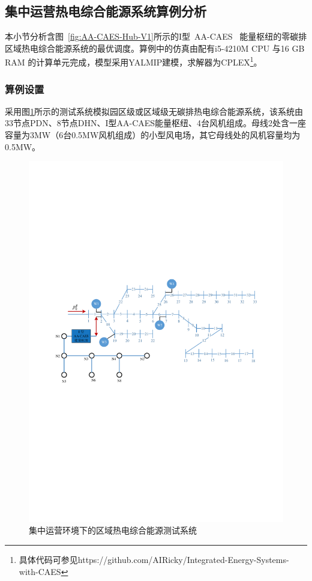 \subsection{集中运营热电综合能源系统算例分析}
本小节分析含图~\ref{fig:AA-CAES-Hub-V1}所示的I型~AA-CAES~ 能量枢纽的零碳排区域热电综合能源系统的最优调度。算例中的仿真由配有i5-4210M CPU 与16 GB RAM 的计算单元完成，模型采用YALMIP\cite{YALMIP}建模，求解器为CPLEX\footnote{具体代码可参见https://github.com/AIRicky/Integrated-Energy-Systems-with-CAES}。

\subsubsection{算例设置}
采用图\ref{Fig:Hub-Dispatch-Exe-PDN33DHN8}所示的测试系统模拟园区级或区域级无碳排热电综合能源系统，该系统由33节点PDN、8节点DHN、I型AA-CAES能量枢纽、4台风机组成。母线2处含一座容量为3MW（6台0.5MW风机组成）的小型风电场，其它母线处的风机容量均为0.5MW。

\begin{figure}[H]
\centering
\includegraphics[scale=0.80]{figures/Chap4-15-Hub-Dispatch-Exe-PDN33DHN8-V2.pdf}
\caption{集中运营环境下的区域热电综合能源测试系统}
\label{Fig:Hub-Dispatch-Exe-PDN33DHN8}
\end{figure}

